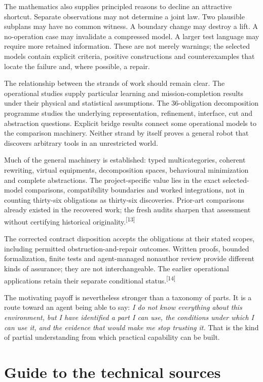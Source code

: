 \documentclass[11pt]{article}
\newcommand{\sn}[1]{\textsuperscript{[#1]}}
\begin{document}
The mathematics also supplies principled reasons to decline an attractive shortcut. Separate observations may not determine a joint law. Two plausible subplans may have no common witness. A boundary change may destroy a lift. A no-operation case may invalidate a compressed model. A larger test language may require more retained information. These are not merely warnings; the selected models contain explicit criteria, positive constructions and counterexamples that locate the failure and, where possible, a repair.

The relationship between the strands of work should remain clear. The operational studies supply particular learning and mission-completion results under their physical and statistical assumptions. The 36-obligation decomposition programme studies the underlying representation, refinement, interface, cut and abstraction questions. Explicit bridge results connect some operational models to the comparison machinery. Neither strand by itself proves a general robot that discovers arbitrary tools in an unrestricted world.

Much of the general machinery is established: typed multicategories, coherent rewriting, virtual equipments, decomposition spaces, behavioural minimization and complete abstractions. The project-specific value lies in the exact selected-model comparisons, compatibility boundaries and worked integrations, not in counting thirty-six obligations as thirty-six discoveries. Prior-art comparisons already existed in the recovered work; the fresh audits sharpen that assessment without certifying historical originality.\sn{13}

The corrected contract disposition accepts the obligations at their stated scopes, including permitted obstruction-and-repair outcomes. Written proofs, bounded formalization, finite tests and agent-managed nonauthor review provide different kinds of assurance; they are not interchangeable. The earlier operational applications retain their separate conditional status.\sn{14}

The motivating payoff is nevertheless stronger than a taxonomy of parts. It is a route toward an agent being able to say: \emph{I do not know everything about this environment, but I have identified a part I can use, the conditions under which I can use it, and the evidence that would make me stop trusting it.} That is the kind of partial understanding from which practical capability can be built.

\appendix
\section{Guide to the technical sources}
\end{document}
